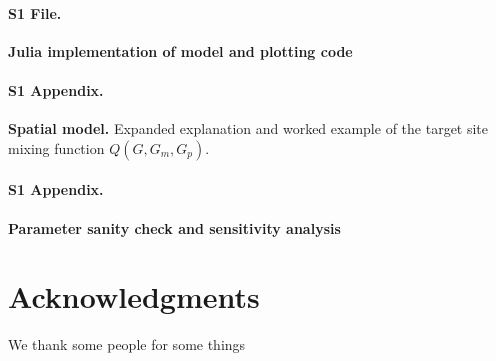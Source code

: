 \documentclass[10pt,letterpaper]{article}
\begin{document}
\paragraph*{S1 File.}
\label{S1_File}
{\bf Julia implementation of model and plotting code}  

\paragraph*{S1 Appendix.}
\label{S1_Appendix}
{\bf Spatial model.} 
Expanded explanation and worked example of the target site mixing function $Q(G, G_m, G_p)$.

\paragraph*{S1 Appendix.}
\label{S2_Appendix}
{\bf Parameter sanity check and sensitivity analysis} 

\section*{Acknowledgments}
We thank some people for some things

\nolinenumbers

%
% 
%




% 

\end{document}
